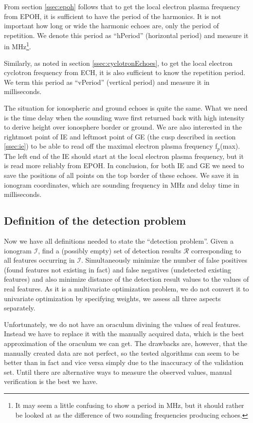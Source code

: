 From section \ref{ssec:epoh} follows that to get the local electron plasma frequency from EPOH, it is sufficient to have the period of the harmonics. It is not important how long or wide the harmonic echoes are, only the period of repetition. We  denote this period as ``hPeriod'' (horizontal period) and measure it in MHz\footnote{It may seem a little confusing to show a period in MHz, but it should rather be looked at as the difference of two sounding frequencies producing echoes.}.

Similarly, as noted in section \ref{ssec:cyclotronEchoes}, to get the local electron cyclotron frequency from ECH, it is also sufficient to know the repetition period. We term this period as ``vPeriod'' (vertical period) and measure it in milliseconds. 

The situation for ionospheric and ground echoes is quite the same. What we need is the time delay when the sounding wave first returned back with high intensity to derive height over ionosphere border or ground. We are also interested in the rightmost point of IE and leftmost point of GE (the cusp described in section \ref{ssec:ie}) to be able to read off the maximal electron plasma frequency f$_p$(max). The left end of the IE should start at the local electron plasma frequency, but it is read more reliably from EPOH. In conclusion, for both IE and GE we need to save the positions of all points on the top border of these echoes. We save it in ionogram coordinates, which are sounding frequency in MHz and delay time in milliseconds.

\subsection{Definition of the detection problem}
Now we have all definitions needed to state the ``detection problem''. Given a ionogram $\mathcal{I}$, find a (possibly empty) set of detection results $\mathcal{R}$ corresponding to all features occurring in $\mathcal{I}$. Simultaneously minimize the number of false positives (found features not existing in fact) and false negatives (undetected existing features) and also minimize distance of the detection result values to the values of real features. As it is a multivariate optimization problem, we do not convert it to univariate optimization by specifying weights, we assess all three aspects separately.

Unfortunately, we do not have an oraculum divining the values of real features. Instead we have to replace it with the manually acquired data, which is the best approximation of the oraculum we can get. The drawbacks are, however, that the manually created data are not perfect, so the tested algorithms can seem to be better than in fact and vice versa simply due to the inaccuracy of the validation set. Until there are alternative ways to measure the observed values, manual verification is the best we have.

